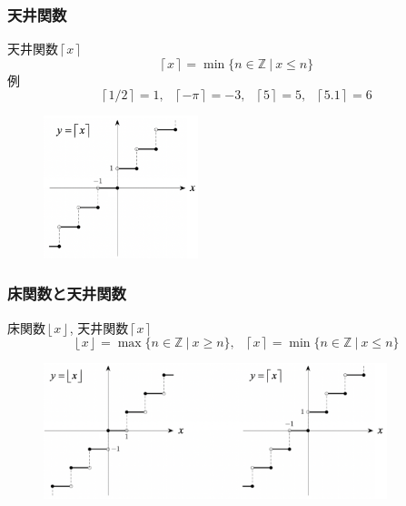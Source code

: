 \documentclass[dvipdfmx,cjk,10.2pt]{beamer}
\newcommand{\Z}{\mathbb{Z}}
\theoremstyle{definition}
\begin{document}
\begin{frame}
\frametitle{天井関数}   


天井関数$\left \lceil{x}\right \rceil$
$$
\left \lceil{x}\right \rceil = \min\{ n \in \Z \ | \ x \le n\}
$$
例
$$
\left \lceil{1/2}\right \rceil =1, \ \ \  \left \lceil{-\pi}\right \rceil =-3, \ \ \ \left \lceil{5}\right \rceil =5,  \ \ \ \left \lceil{5.1}\right \rceil =6
$$

\vspace{-1mm}

\begin{figure}[htbp]
 \begin{center} 
  \includegraphics[width=45mm]{ceiling.png}
 \end{center}
\end{figure}
\vspace{-4mm}

\end{frame}






\begin{frame}
\frametitle{床関数と天井関数}   


床関数$\left \lfloor{x}\right \rfloor $, 天井関数$\left \lceil{x}\right \rceil$
$$
\left \lfloor{x}\right \rfloor = \max\{ n \in \Z \ | \ x \ge n\}, \ \ \ \left \lceil{x}\right \rceil = \min\{ n \in \Z \ | \ x \le n\}
$$

\vspace{-1mm}

\begin{figure}[htbp]
 \begin{center} 
  \includegraphics[width=100mm]{floor_ceiling.png}
 \end{center}
\end{figure}
\vspace{-4mm}

\end{frame}
\end{document}
